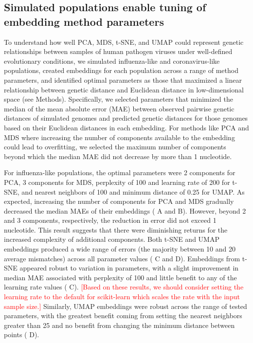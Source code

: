 \documentclass[10pt,letterpaper]{article}
\def\jhc#1{\textcolor{red}{[#1]}}
\begin{document}
\subsection*{Simulated populations enable tuning of embedding method parameters}

To understand how well PCA, MDS, t-SNE, and UMAP could represent genetic relationships between samples of human pathogen viruses under well-defined evolutionary conditions, we simulated influenza-like and coronavirus-like populations, created embeddings for each population across a range of method parameters, and identified optimal parameters as those that maximized a linear relationship between genetic distance and Euclidean distance in low-dimensional space (see Methods).
Specifically, we selected parameters that minimized the median of the mean absolute error (MAE) between observed pairwise genetic distances of simulated genomes and predicted genetic distances for those genomes based on their Euclidean distances in each embedding.
For methods like PCA and MDS where increasing the number of components available to the embedding could lead to overfitting, we selected the maximum number of components beyond which the median MAE did not decrease by more than 1 nucleotide.

For influenza-like populations, the optimal parameters were 2 components for PCA, 3 components for MDS, perplexity of 100 and learning rate of 200 for t-SNE, and nearest neighbors of 100 and minimum distance of 0.25 for UMAP.
As expected, increasing the number of components for PCA and MDS gradually decreased the median MAEs of their embeddings ( A and B).
However, beyond 2 and 3 components, respectively, the reduction in error did not exceed 1 nucleotide.
This result suggests that there were diminishing returns for the increased complexity of additional components.
Both t-SNE and UMAP embeddings produced a wide range of errors (the majority between 10 and 20 average mismatches) across all parameter values ( C and D).
Embeddings from t-SNE appeared robust to variation in parameters, with a slight improvement in median MAE associated with perplexity of 100 and little benefit to any of the learning rate values ( C).
\jhc{Based on these results, we should consider setting the learning rate to the default for scikit-learn which scales the rate with the input sample size.}
Similarly, UMAP embeddings were robust across the range of tested parameters, with the greatest benefit coming from setting the nearest neighbors greater than 25 and no benefit from changing the minimum distance between points ( D).
\end{document}

